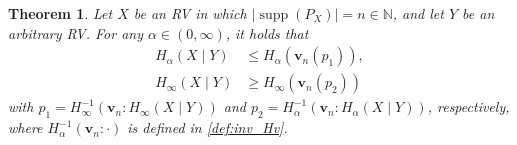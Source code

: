 \documentclass[conference, draftcls, onecolumn]{IEEEtran}
\theoremstyle{plain}
\newtheorem{theorem}{Theorem}
\newcommand{\bvec}[1]{\boldsymbol{#1}}
\newcommand{\supp}{\operatorname{supp}}
\begin{document}
\begin{theorem}
\label{th:A_renyi_alpha_inf}
Let $X$ be an RV in which $|\!\supp(P_{X})| = n \in \mathbb{N}$, and let $Y$ be an arbitrary RV.
For any $\alpha \in (0, \infty)$, it holds that
\begin{align}
H_{\alpha}(X \mid Y)
& \le
H_{\alpha}( \bvec{v}_{n}( p_{1} ) ) ,
\label{ineq:alpha_inf} \\
H_{\infty}(X \mid Y)
& \ge
H_{\infty}( \bvec{v}_{n}( p_{2} ) )
\label{ineq:inf_alpha}
\end{align}
with $p_{1} = H_{\infty}^{-1}( \bvec{v}_{n} : H_{\infty}(X \mid Y) )$ and $p_{2} = H_{\alpha}^{-1}( \bvec{v}_{n} : H_{\alpha}(X \mid Y) )$, respectively, where $H_{\alpha}^{-1}( \bvec{v}_{n} : \cdot )$ is defined in \eqref{def:inv_Hv}.
\end{theorem}
\end{document}
